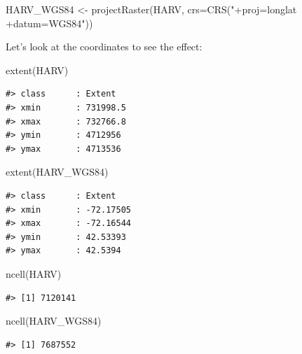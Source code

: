 \documentclass[
  11pt,
]{book}
\newenvironment{Shaded}{\begin{snugshade}}{\end{snugshade}}
\newcommand{\AttributeTok}[1]{\textcolor[rgb]{0.77,0.63,0.00}{#1}}
\newcommand{\FunctionTok}[1]{\textcolor[rgb]{0.00,0.00,0.00}{#1}}
\newcommand{\NormalTok}[1]{#1}
\newcommand{\OtherTok}[1]{\textcolor[rgb]{0.56,0.35,0.01}{#1}}
\newcommand{\StringTok}[1]{\textcolor[rgb]{0.31,0.60,0.02}{#1}}
\begin{document}
\begin{Shaded}
\begin{Highlighting}[]
\NormalTok{HARV\_WGS84 }\OtherTok{\textless{}{-}} \FunctionTok{projectRaster}\NormalTok{(HARV, }\AttributeTok{crs=}\FunctionTok{CRS}\NormalTok{(}\StringTok{"+proj=longlat +datum=WGS84"}\NormalTok{))}
\end{Highlighting}
\end{Shaded}

Let's look at the coordinates to see the effect:

\begin{Shaded}
\begin{Highlighting}[]
\FunctionTok{extent}\NormalTok{(HARV)}
\end{Highlighting}
\end{Shaded}

\begin{verbatim}
#> class      : Extent 
#> xmin       : 731998.5 
#> xmax       : 732766.8 
#> ymin       : 4712956 
#> ymax       : 4713536
\end{verbatim}

\begin{Shaded}
\begin{Highlighting}[]
\FunctionTok{extent}\NormalTok{(HARV\_WGS84)}
\end{Highlighting}
\end{Shaded}

\begin{verbatim}
#> class      : Extent 
#> xmin       : -72.17505 
#> xmax       : -72.16544 
#> ymin       : 42.53393 
#> ymax       : 42.5394
\end{verbatim}

\begin{Shaded}
\begin{Highlighting}[]
\FunctionTok{ncell}\NormalTok{(HARV)}
\end{Highlighting}
\end{Shaded}

\begin{verbatim}
#> [1] 7120141
\end{verbatim}

\begin{Shaded}
\begin{Highlighting}[]
\FunctionTok{ncell}\NormalTok{(HARV\_WGS84)}
\end{Highlighting}
\end{Shaded}

\begin{verbatim}
#> [1] 7687552
\end{verbatim}
\end{document}

